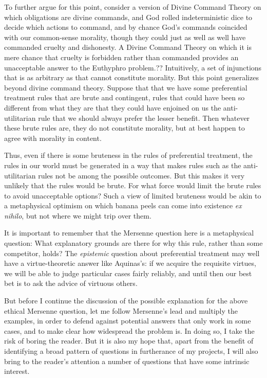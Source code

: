 To further argue for this point, consider a version of Divine Command Theory on which obligations are divine commands, and
God rolled indeterministic
dice to decide which actions to command, and by chance God's commands coincided with our common-sense morality, though they
could just as well as well have commanded cruelty and dishonesty. A Divine Command Theory on which it is mere chance
that cruelty is forbidden rather than commanded provides an unacceptable answer to the Euthyphro problem.??
Intuitively, a set of injunctions that is as arbitrary as that cannot constitute morality. But this point generalizes beyond
divine command theory. Suppose that that we have some preferential treatment rules that are brute and contingent, rules
that could have been so different from what they are that they could have enjoined on us the anti-utilitarian rule that we should always prefer the lesser benefit. Then whatever
these brute rules are, they do not constitute morality, but at best happen to agree with morality in content. 

Thus, even if there is some bruteness in the rules of preferential treatment, the rules in our world must be generated in a way
that makes rules such as the anti-utilitarian rules not be among the possible outcomes. But this makes it very unlikely that
the rules would be brute. For what force would limit the brute rules to avoid unacceptable options? Such a view of limited
bruteness would be akin to a metaphysical optimism on which banana peels can come into existence \textit{ex nihilo}, but not where we might trip
over them.

It is important to remember that the Mersenne question here is a metaphysical question: What explanatory grounds are there for why this
rule, rather than some competitor, holds? The \textit{epistemic} question about preferential treatment may well have a virtue-theoretic answer like Aquinas's: if
we acquire the requisite virtues, we will be able to judge particular cases fairly reliably, and until then our best bet is
to ask the advice of virtuous others.

But before I continue the discussion of the possible explanation for the above ethical Mersenne question, let me follow
Mersenne's lead and multiply the examples, in order to defend against potential answers that only work in some cases, and
to make clear how widespread the problem is. In doing so, I take the risk of boring the reader. But it is also my
hope that, apart from the benefit of identifying a broad pattern of questions in furtherance of my projects, I will 
also bring to the reader's attention a number of questions that have some intrinsic interest.

